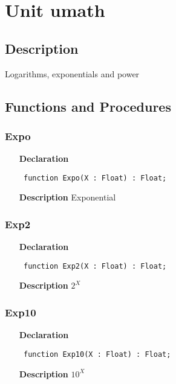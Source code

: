 \documentclass[12pt,a4paper,oneside]{report}
\newcommand{\declarationitem}[1]{\textbf{#1}}
\newcommand{\descriptiontitle}[1]{\textbf{#1}}
\newcommand{\code}[1]{\texttt{#1}}
\begin{document}
\section{Unit umath}
\label{umath}
\subsection{Description}
Logarithms, exponentials and power 
\subsection{Functions and Procedures}
\subsubsection{Expo}
\label{umath-Expo}
\begin{itemize}\item[\declarationitem{Declaration}\hfill]
	\begin{flushleft}
		\code{
			function Expo(X : Float) : Float;}
		
	\end{flushleft}
	
	\par
	\item[\descriptiontitle{Description}]
	Exponential
	
\end{itemize}
\subsubsection{Exp2}
\label{umath-Exp2}
\begin{itemize}\item[\declarationitem{Declaration}\hfill]
	\begin{flushleft}
		\code{
			function Exp2(X : Float) : Float;}
		
	\end{flushleft}
	
	\par
	\item[\descriptiontitle{Description}]
	$2^X$
	
\end{itemize}
\subsubsection{Exp10}
\label{umath-Exp10}
\begin{itemize}\item[\declarationitem{Declaration}\hfill]
	\begin{flushleft}
		\code{
			function Exp10(X : Float) : Float;}
		
	\end{flushleft}
	
	\par
	\item[\descriptiontitle{Description}]
	$10^X$
	
\end{itemize}
\end{document}
